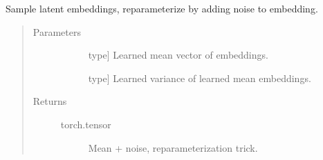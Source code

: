 \documentclass[letterpaper,10pt,english]{sphinxmanual}
\begin{document}
\begin{fulllineitems}

\begin{fulllineitems}
\label{\detokenize{index:methylnet.models.TybaltTitusVAE.sample_z}}
Sample latent embeddings, reparameterize by adding noise to embedding.
\begin{quote}\begin{description}
\item[{Parameters}] \leavevmode\begin{description}
\item[{}] \leavevmode{[}type{]}
Learned mean vector of embeddings.

\item[{}] \leavevmode{[}type{]}
Learned variance of learned mean embeddings.

\end{description}

\item[{Returns}] \leavevmode\begin{description}
\item[{torch.tensor}] \leavevmode
Mean + noise, reparameterization trick.

\end{description}

\end{description}\end{quote}

\end{fulllineitems}


\end{fulllineitems}

\end{document}
